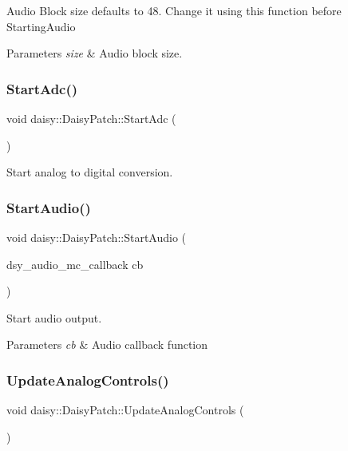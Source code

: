 Audio Block size defaults to 48. Change it using this function before Starting\+Audio 
\begin{DoxyParams}{Parameters}
{\em size} & Audio block size. \\
\hline
\end{DoxyParams}
\mbox{\label{classdaisy_1_1_daisy_patch_aef89b7d3492d87652af2207f315e6c6d}} 
\subsubsection{\texorpdfstring{Start\+Adc()}{StartAdc()}}
{\footnotesize\ttfamily void daisy\+::\+Daisy\+Patch\+::\+Start\+Adc (\begin{DoxyParamCaption}{ }\end{DoxyParamCaption})}

Start analog to digital conversion. \mbox{\label{classdaisy_1_1_daisy_patch_a0187184a92724b936d7e7307565ade32}} 
\subsubsection{\texorpdfstring{Start\+Audio()}{StartAudio()}}
{\footnotesize\ttfamily void daisy\+::\+Daisy\+Patch\+::\+Start\+Audio (\begin{DoxyParamCaption}\item[{dsy\+\_\+audio\+\_\+mc\+\_\+callback}]{cb }\end{DoxyParamCaption})}

Start audio output. 
\begin{DoxyParams}{Parameters}
{\em cb} & Audio callback function \\
\hline
\end{DoxyParams}
\mbox{\label{classdaisy_1_1_daisy_patch_ae2ad525616e3ae3a336e8cff2fec9ab0}} 
\subsubsection{\texorpdfstring{Update\+Analog\+Controls()}{UpdateAnalogControls()}}
{\footnotesize\ttfamily void daisy\+::\+Daisy\+Patch\+::\+Update\+Analog\+Controls (\begin{DoxyParamCaption}{ }\end{DoxyParamCaption})}

